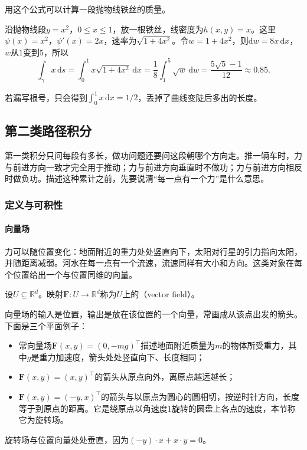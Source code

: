 用这个公式可以计算一段抛物线铁丝的质量。
\begin{example}[抛物线铁丝的质量]
沿抛物线段$y=x^2$，$0\leq x\leq1$，放一根铁丝，线密度为$h(x,y)=x$。这里$\psi(x)=x^2$，$\psi'(x)=2x$，速率为$\sqrt{1+4x^2}$。令$w=1+4x^2$，则$\mathrm dw=8x\,\mathrm dx$，$w$从$1$变到$5$，所以
\[
 \int_\gamma x\,\mathrm ds=\int_0^1x\sqrt{1+4x^2}\,\mathrm dx
 =\frac18\int_1^5\sqrt w\,\mathrm dw=\frac{5\sqrt5-1}{12}\approx0.85.
\]
\end{example}
若漏写根号，只会得到$\int_0^1x\,\mathrm dx=1/2$，丢掉了曲线变陡后多出的长度。

\subsection{第二类路径积分}

第一类积分只问每段有多长，做功问题还要问这段朝哪个方向走。推一辆车时，力与前进方向一致才完全用于推动；力与前进方向垂直时不做功；力与前进方向相反时做负功。描述这种累计之前，先要说清“每一点有一个力”是什么意思。

\subsubsection{定义与可积性}

\paragraph{向量场}

力可以随位置变化：地面附近的重力处处竖直向下，太阳对行星的引力指向太阳，并随距离减弱。河水在每一点有一个流速，流速同样有大小和方向。这类对象在每个位置给出一个与位置同维的向量。
\begin{definition}[向量场]
设$U\subseteq\mathbb R^d$。映射$\bm F:U\to\mathbb R^d$称为$U$上的（vector field）。
\end{definition}

向量场的输入是位置，输出是放在该位置的一个向量，常画成从该点出发的箭头。下面是三个平面例子：
\begin{itemize}
 \item 常向量场$\bm F(x,y)=(0,-mg)^\top$描述地面附近质量为$m$的物体所受重力，其中$g$是重力加速度，箭头处处竖直向下、长度相同；
 \item $\bm F(x,y)=(x,y)^\top$的箭头从原点向外，离原点越远越长；
 \item $\bm F(x,y)=(-y,x)^\top$的箭头与以原点为圆心的圆相切，按逆时针方向，长度等于到原点的距离。它是绕原点以角速度$1$旋转的圆盘上各点的速度，本节称它为旋转场。
\end{itemize}
旋转场与位置向量处处垂直，因为$(-y)\cdot x+x\cdot y=0$。

